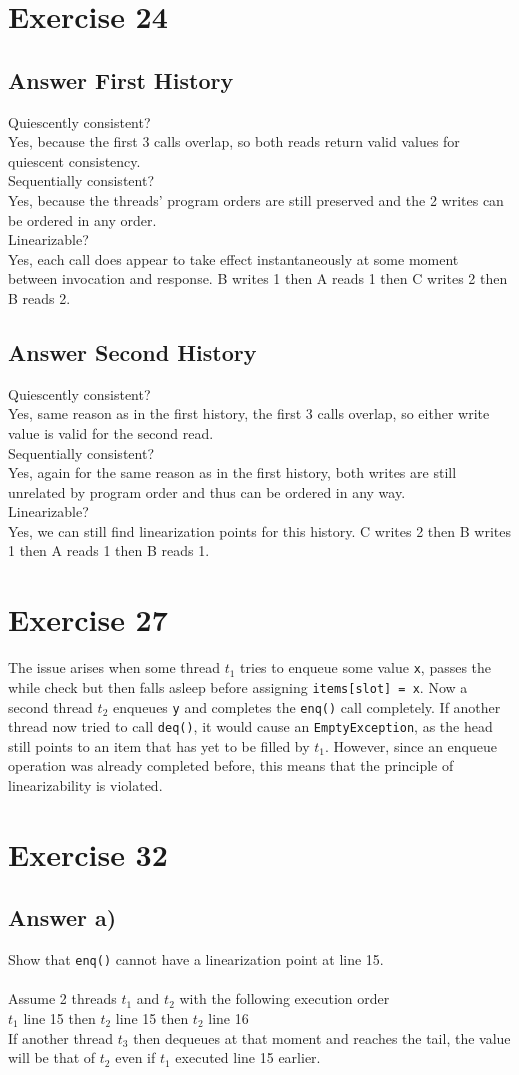 \documentclass[a4paper,%
11pt,%
DIV=14,
headsepline,%
headings=normal,
]{scrartcl}
\newcommand{\exercise}[1]{\section*{Exercise #1}}
\newcommand{\answer}[1]{\subsection*{Answer #1}}
\begin{document}
\exercise{24} 

\answer{First History}

Quiescently consistent?\\
Yes, because the first 3 calls overlap, so both reads return valid values for quiescent consistency.\\
Sequentially consistent?\\
Yes, because the threads' program orders are still preserved and the 2 writes can be ordered in any order.\\
Linearizable?\\
Yes, each call does appear to take effect instantaneously at some moment between invocation and response. B writes 1 then A reads 1 then C writes 2 then B reads 2.

\answer{Second History}
Quiescently consistent?\\
Yes, same reason as in the first history, the first 3 calls overlap, so either write value is valid for the second read.\\
Sequentially consistent?\\
Yes, again for the same reason as in the first history, both writes are still unrelated by program order and thus can be ordered in any way.\\
Linearizable?\\
Yes, we can still find linearization points for this history. C writes 2 then B writes 1 then A reads 1 then B reads 1.

\exercise{27}
\label{ex27}

The issue arises when some thread $t_1$ tries to enqueue some value \texttt{x}, passes the while check but then falls asleep before assigning \texttt{items[slot] = x}. Now a second thread $t_2$ enqueues \texttt{y} and completes the \texttt{enq()} call completely. If another thread now tried to call \texttt{deq()}, it would cause an \texttt{EmptyException}, as the head still points to an item that has yet to be filled by $t_1$. However, since an enqueue operation was already completed before, this means that the principle of linearizability is violated.

\exercise{32}

\answer{a)}
Show that \texttt{enq()} cannot have a linearization point at line 15.\\
\\
Assume 2 threads $t_1$ and $t_2$ with the following execution order\\
$t_1$ line 15 then $t_2$ line 15 then $t_2$ line 16\\
If another thread $t_3$ then dequeues at that moment and reaches the tail, the value will be that of $t_2$ even if $t_1$ executed line 15 earlier.
\end{document}
